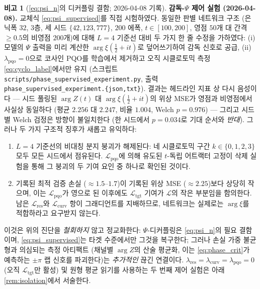 \documentclass[11pt, a4paper]{article}
\theoremstyle{definition}
\newtheorem{remark}{비고}[section]
\theoremstyle{plain}
\newcommand{\xif}{\xi}
\newcommand{\Psip}{\Psi}
\begin{document}
\begin{remark}[\cref{eq:psi_n}의 디커플링 결함; 2026-04-08 기록]
\smallskip\noindent\textbf{감독-$\Psip$ 제어 실험 (2026-04-08).} 교체식 \cref{eq:psi_supervised}를 직접 시험하였다. 동일한 판별 네트워크 구조 (은닉폭 $32$, 3층, 세 시드 $\{42,123,777\}$, $200$ 에폭, $t \in [100, 200]$, 영점 $50$개 대 간격 $\geq 0.5$의 비영점 $200$개)에 대해 $L=4$ 기준선 대비 두 가지 한 줄 수정을 가하였다: (i) 모델의 $\Psip$ 출력을 미리 계산한 $\arg\xif(\tfrac{1}{2}+it)$로 덮어쓰기하여 감독 신호로 공급, (ii) $\lambda_{\mathrm{pqo}}=0$으로 코사인 PQO를 학습에서 제거하고 오직 시클로토믹 측정 \cref{eq:cyclo_label}에서만 유지 (스크립트 \texttt{scripts/phase\_supervised\_experiment.py}, 출력 \texttt{phase\_supervised\_experiment.\{json,txt\}}). 결과는 헤드라인 지표 상 다시 음성이다 --- 시드 풀링된 $\arg Z(t)$ 대 $\arg \xif(\tfrac{1}{2}+it)$의 위상 MSE가 영점과 비영점에서 사실상 동일하다 (평균 $2.256$ 대 $2.247$, 비율 $1.004$, Welch $p = 0.976$) --- 그리고 시드별 Welch 검정은 방향이 불일치한다 (한 시드에서 $p=0.034$로 기대 순서와 \emph{반대}). 그러나 두 가지 구조적 징후가 새롭고 유익하다:
\begin{enumerate}
  \item $L=4$ 기준선의 비대칭 분지 붕괴가 해제된다: 네 시클로토믹 구간 $k\in\{0,1,2,3\}$ 모두 모든 시드에서 점유된다. $\mathcal{L}_{\mathrm{pqo}}$에 의해 유도된 $t$-독립 어트랙터 고정이 삭제 실험을 통해 그 붕괴의 두 기여 요인 중 하나로 확인된 것이다.
  \item 기록된 최적 검증 손실 ($\approx 1.5$--$1.7$)이 기록된 위상 MSE ($\approx 2.25$)보다 상당히 작으며, 이는 $\mathcal{L}_{\mathrm{pqo}}$가 영으로 된 이후에도 $\mathcal{L}_{\mathrm{tgt}}$ 기여가 $\mathcal{L}$의 작은 부분임을 함의한다. 남은 $\mathcal{L}_{\mathrm{res}}$와 $\mathcal{L}_{\mathrm{curv}}$ 항이 그래디언트를 지배하므로, 네트워크는 실제로는 $\arg \xif$를 적합하라고 요구받지 않는다.
\end{enumerate}
이것은 위의 진단을 \emph{철회하지} 않고 정교화한다: $\Psip$-디커플링은 \cref{eq:psi_n}의 필요 결함이며, \cref{eq:psi_supervised}는 타겟 수준에서만 그것을 복구한다; 그러나 손실 가중 불균형과 의심되는 측정 아티팩트 (채널별 $\arg Z$의 산술 평균화, 이는 \cref{eq:phase_crit}가 예측하는 $\pm\pi$ 랩 신호를 파괴한다)는 \emph{추가적인} 끊긴 연결이다. $\lambda_{\mathrm{res}}=\lambda_{\mathrm{curv}}=\lambda_{\mathrm{pqo}}=0$ (오직 $\mathcal{L}_{\mathrm{tgt}}$만 활성) 및 원형 평균 읽기를 사용하는 두 번째 제어 실험은 아래 \cref{rem:isolation}에서 서술한다.
\end{remark}
\end{document}
